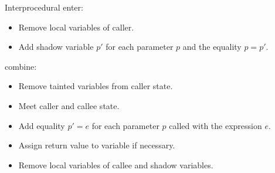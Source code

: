 \documentclass{beamer}
\begin{document}
\begin{frame}{Interprocedural}
    enter:
    \begin{itemize}
        \item Remove local variables of caller.
        \item Add shadow variable $p'$ for each parameter $p$ and the equality $p = p'$.
    \end{itemize}
    combine:
    \begin{itemize}
        \item Remove tainted variables from caller state.
        \item Meet caller and callee state.
        \item Add equality $p' = e$ for each parameter $p$ called with the expression $e$.
        \item Assign return value to variable if necessary.
        \item Remove local variables of callee and shadow variables.
    \end{itemize}
\end{frame}
\end{document}
